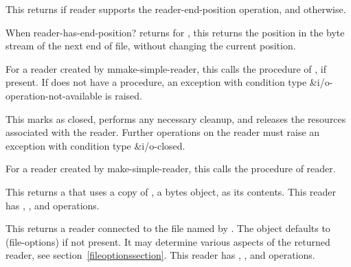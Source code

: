 \begin{entry}{%
}
   
This returns \schtrue{} if reader supports the {\cf reader-end-position}
operation, and \schfalse{} otherwise.
\end{entry}   

\begin{entry}{%
}
   
When {\cf reader-has-end-position?} returns \schtrue{} for ,
this returns the position in the byte stream of the next end of file,
without changing the current position.
   
For a reader created by {\cf mmake-simple-reader}, this calls the
 procedure of , if present. If
 does not have a  procedure, an
exception with condition type {\cf\&i/o-operation-not-available} is raised.
\end{entry}

\begin{entry}{%
}
   
This marks  as closed, performs any necessary cleanup, and
releases the resources associated with the reader. Further operations
on the reader must raise an exception with condition type
{\cf\&i/o-closed}.
   
For a reader created by {\cf make-simple-reader}, this calls the
 procedure of reader.
\end{entry}

\begin{entry}{%
}
   
This returns a  that uses a copy of
, a bytes object, as its contents. This reader has
, , and 
operations.
\end{entry}

\begin{entry}{%
}
   
This returns a reader connected to the file named by .
The  object defaults to {\cf (file-options)} if not
present. It may determine various aspects of the returned reader, see
section~\ref{fileoptionssection}. This reader has ,
, and  operations.
\end{entry} 

